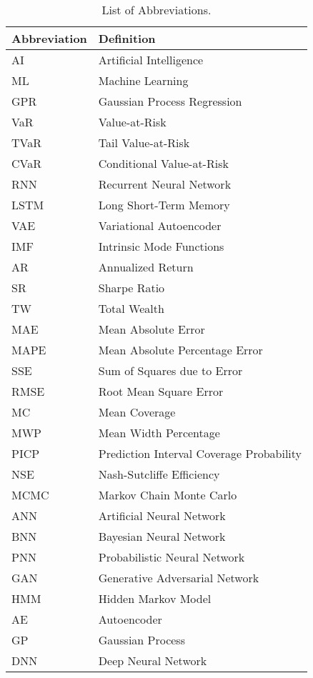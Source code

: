 \begin{table}[H]
    \centering
    \caption[List of Abbreviations]{List of Abbreviations.}
    \label{table:abbreviations}
    \small
    \begin{adjustbox}{width=1\textwidth,center}
    \begin{tabular}{lp{}}
        \toprule
        \textbf{Abbreviation} & \textbf{Definition} \\
        \midrule
        AI & Artificial Intelligence \\
        ML & Machine Learning \\
        GPR & Gaussian Process Regression \\
        VaR & Value-at-Risk \\
        TVaR & Tail Value-at-Risk \\
        CVaR & Conditional Value-at-Risk \\
        RNN & Recurrent Neural Network \\
        LSTM & Long Short-Term Memory \\
        VAE & Variational Autoencoder \\
        IMF & Intrinsic Mode Functions \\
        AR & Annualized Return \\
        SR & Sharpe Ratio \\
        TW & Total Wealth \\
        MAE & Mean Absolute Error \\
        MAPE & Mean Absolute Percentage Error \\
        SSE & Sum of Squares due to Error \\
        RMSE & Root Mean Square Error \\
        MC & Mean Coverage \\
        MWP & Mean Width Percentage \\
        PICP & Prediction Interval Coverage Probability \\
        NSE & Nash-Sutcliffe Efficiency \\
        MCMC & Markov Chain Monte Carlo \\
        ANN & Artificial Neural Network \\
        BNN & Bayesian Neural Network \\
        PNN & Probabilistic Neural Network \\
        GAN & Generative Adversarial Network \\
        HMM & Hidden Markov Model \\
        AE & Autoencoder \\
        GP & Gaussian Process \\
        DNN & Deep Neural Network \\
        \bottomrule
    \end{tabular}
    \end{adjustbox}
\end{table}



